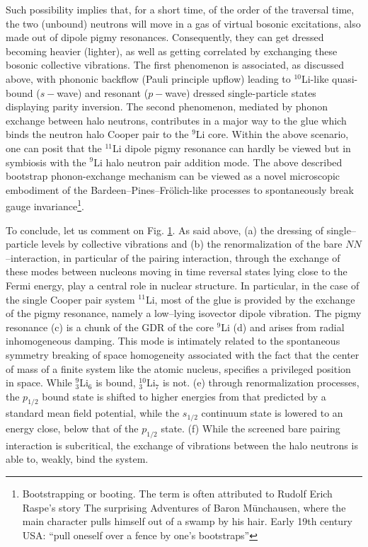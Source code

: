 \begin{subappendices}
\begin{figure}[h!]
\label{fig8_A_1}
\end{figure}
Such possibility implies that, for a short time, of the order of the traversal time, the two (unbound) neutrons will move in a gas of virtual bosonic excitations, also made out of dipole pigmy resonances. Consequently, they can get dressed becoming heavier (lighter), as well as getting correlated by exchanging  these bosonic collective vibrations. 
The first phenomenon is associated, as discussed above, with phononic backflow (Pauli principle upflow) leading to $^{10}$Li-like quasi-bound ($s-$wave) and resonant ($p-$wave) dressed single-particle states displaying parity inversion.
The second phenomenon, mediated by phonon exchange between halo neutrons, contributes in a major way to the glue which binds the neutron halo Cooper pair to the $^{9}$Li core. Within the above scenario, one can posit that the $^{11}$Li dipole pigmy resonance can hardly be viewed but in symbiosis with the $^9$Li halo neutron pair addition mode. The above described bootstrap phonon-exchange mechanism can be viewed as a novel microscopic embodiment of the Bardeen--Pines--Fr\"{o}lich-like processes to spontaneously break gauge invariance\footnote{Bootstrapping or booting. The term is often attributed to Rudolf Erich Raspe's story The surprising Adventures of Baron M\=unchausen, where the main character pulls himself out of a swamp by his hair. Early 19th century USA: ``pull oneself over a fence by one's bootstraps''}.


To conclude, let us comment on Fig. \ref{fig8_A_1}. As said above, (a) the dressing of single--particle levels by collective vibrations and (b) the renormalization of the bare $NN$--interaction, in particular of the pairing interaction, through the exchange of these modes between nucleons moving in time reversal states lying close to the Fermi energy, play a central role in nuclear structure. In particular, in the case of the single Cooper pair system $^{11}$Li, most of the glue is provided by the exchange of the pigmy resonance, namely a low--lying isovector dipole vibration. The pigmy resonance (c) is a chunk of the GDR of the core $^9$Li (d) and arises from radial inhomogeneous damping. This mode is intimately related to the spontaneous symmetry breaking of space homogeneity associated with the fact that the center of mass of a finite system like the atomic nucleus, specifies a privileged position in space. While $^9_3$Li$_6$ is bound, $^{10}_3$Li$_7$ is not. (e) through renormalization processes, the $p_{1/2}$ bound state is shifted to higher energies from that predicted by a standard mean field potential, while the $s_{1/2}$ continuum state is lowered to an energy close,  below that of the $p_{1/2}$ state. (f) While the screened bare pairing interaction is subcritical, the exchange of vibrations between the halo neutrons is able to, weakly, bind the system.







\end{subappendices}

